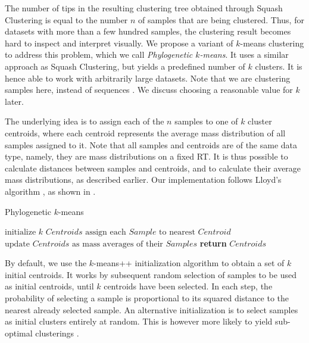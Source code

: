 The number of tips in the resulting clustering tree obtained through Squash Clustering
is equal to the number $n$ of samples that are being clustered.
Thus, for datasets with more than a few hundred samples,
the clustering result becomes hard to inspect and interpret visually.
We propose a variant of $k$-means clustering \cite{Macqueen1967} to address this problem,
which we call \emph{Phylogenetic $k$-means}.
It uses a similar approach as Squash Clustering, but yields a predefined number of $k$ clusters.
It is hence able to work with arbitrarily large datasets.
Note that we are clustering samples here, instead of sequences \cite{Kelley2010}.
We discuss choosing a reasonable value for $k$ later.

The underlying idea is to assign each of the $n$ samples to one of $k$ cluster centroids,
where each centroid represents the average mass distribution of all samples assigned to it.
Note that all samples and centroids are of the same data type,
namely, they are mass distributions on a fixed \ac{RT}.
It is thus possible to calculate distances between samples and centroids,
and to calculate their average mass distributions, as described earlier.
Our implementation follows Lloyd's algorithm \cite{Lloyd1982},
as shown in .

\vspace*{1em} %
\begin{algorithm}
\caption{Phylogenetic $k$-means}\label{algo:kmeans}
\begin{algorithmic}[1]
    \State $ \text{initialize } \textit{k Centroids} $
        \State $ \text{assign each } \textit{Sample} \text{ to nearest } \textit{Centroid} $
        \State $ \text{update } \textit{Centroids} \text{ as mass averages of their } \textit{Samples} $
    \EndWhile
    \State \textbf{return}  $\textit{Centroids}$
\end{algorithmic}
\end{algorithm}

By default, we use the $k$-means++ initialization algorithm \cite{Arthur2007} to obtain a set of $k$ initial centroids.
It works by subsequent random selection of samples to be used as initial centroids,
until $k$ centroids have been selected.
In each step, the probability of selecting a sample is
proportional to its squared distance to the nearest already selected sample.
An alternative initialization is to select samples as initial clusters entirely at random.
This is however more likely to yield sub-optimal clusterings \cite{Kanungo2003}.

